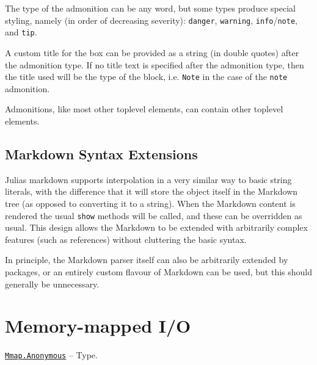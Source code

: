 The type of the admonition can be any word, but some types produce special styling, namely (in order of decreasing severity): \texttt{danger}, \texttt{warning}, \texttt{info}/\texttt{note}, and \texttt{tip}.



A custom title for the box can be provided as a string (in double quotes) after the admonition type. If no title text is specified after the admonition type, then the title used will be the type of the block, i.e. \texttt{{\textquotedbl}Note{\textquotedbl}} in the case of the \texttt{note} admonition.



Admonitions, like most other toplevel elements, can contain other toplevel elements.



\hypertarget{10627994621615977524}{}


\section{Markdown Syntax Extensions}



Julia{\textquotesingle}s markdown supports interpolation in a very similar way to basic string literals, with the difference that it will store the object itself in the Markdown tree (as opposed to converting it to a string). When the Markdown content is rendered the usual \texttt{show} methods will be called, and these can be overridden as usual. This design allows the Markdown to be extended with arbitrarily complex features (such as references) without cluttering the basic syntax.



In principle, the Markdown parser itself can also be arbitrarily extended by packages, or an entirely custom flavour of Markdown can be used, but this should generally be unnecessary.



\hypertarget{14013857700397032684}{}


\chapter{Memory-mapped I/O}


\hypertarget{8426825172443272214}{} 
\hyperlink{8426825172443272214}{\texttt{Mmap.Anonymous}}  -- {Type.}


